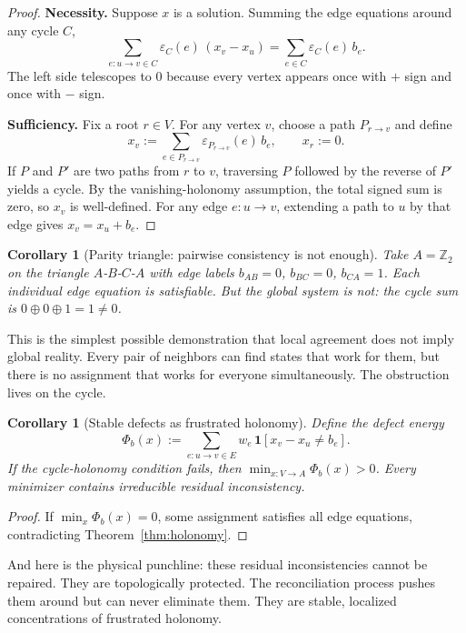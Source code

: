 \documentclass[11pt]{article}
\newtheorem{corollary}[theorem]{Corollary}
\begin{document}
\begin{proof}
\textbf{Necessity.} Suppose $x$ is a solution. Summing the edge equations around any cycle $C$,
\[
\sum_{e:u\to v\in C}\varepsilon_C(e)\,(x_v-x_u)
=
\sum_{e\in C}\varepsilon_C(e)\,b_e.
\]
The left side telescopes to $0$ because every vertex appears once with $+$ sign and once with $-$ sign.

\textbf{Sufficiency.} Fix a root $r\in V$. For any vertex $v$, choose a path $P_{r\to v}$ and define
\[
x_v := \sum_{e\in P_{r\to v}} \varepsilon_{P_{r\to v}}(e)\, b_e,
\qquad x_r:=0.
\]
If $P$ and $P'$ are two paths from $r$ to $v$, traversing $P$ followed by the reverse of $P'$ yields a cycle. By the vanishing-holonomy assumption, the total signed sum is zero, so $x_v$ is well-defined. For any edge $e:u\to v$, extending a path to $u$ by that edge gives $x_v = x_u + b_e$.
\end{proof}

\begin{corollary}[Parity triangle: pairwise consistency is not enough]\label{cor:triangle}
Take $A=\mathbb{Z}_2$ on the triangle $A$-$B$-$C$-$A$ with edge labels $b_{AB}=0$, $b_{BC}=0$, $b_{CA}=1$. Each individual edge equation is satisfiable. But the global system is not: the cycle sum is $0\oplus 0\oplus 1 = 1\neq 0$.
\end{corollary}

This is the simplest possible demonstration that local agreement does not imply global reality. Every pair of neighbors can find states that work for them, but there is no assignment that works for everyone simultaneously. The obstruction lives on the cycle.

\begin{corollary}[Stable defects as frustrated holonomy]\label{cor:defects}
Define the defect energy
\[
\Phi_b(x) := \sum_{e:u\to v\in E} w_e\,\mathbf{1}\!\left[x_v - x_u \neq b_e\right].
\]
If the cycle-holonomy condition fails, then $\min_{x:V\to A}\Phi_b(x)>0$. Every minimizer contains irreducible residual inconsistency.
\end{corollary}

\begin{proof}
If $\min_x\Phi_b(x)=0$, some assignment satisfies all edge equations, contradicting Theorem~\ref{thm:holonomy}.
\end{proof}

And here is the physical punchline: these residual inconsistencies cannot be repaired. They are topologically protected. The reconciliation process pushes them around but can never eliminate them. They are stable, localized concentrations of frustrated holonomy.
\end{document}
